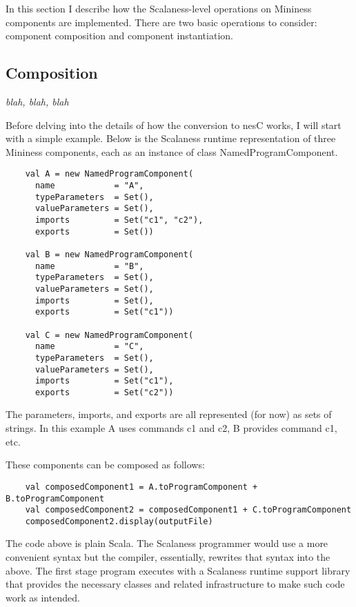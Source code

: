 In this section I describe how the Scalaness-level operations on Mininess components are
implemented. There are two basic operations to consider: component composition and component
instantiation.

\subsection{Composition}

\textit{blah, blah, blah}

Before delving into the details of how the conversion to nesC works, I will start with a simple
example. Below is the Scalaness runtime representation of three Mininess components, each as an
instance of class NamedProgramComponent.

\singlespace
\begin{lstlisting}
    val A = new NamedProgramComponent(
      name            = "A",
      typeParameters  = Set(),
      valueParameters = Set(),
      imports         = Set("c1", "c2"),
      exports         = Set())

    val B = new NamedProgramComponent(
      name            = "B",
      typeParameters  = Set(),
      valueParameters = Set(),
      imports         = Set(),
      exports         = Set("c1"))

    val C = new NamedProgramComponent(
      name            = "C",
      typeParameters  = Set(),
      valueParameters = Set(),
      imports         = Set("c1"),
      exports         = Set("c2"))
\end{lstlisting}
\primaryspacing

The parameters, imports, and exports are all represented (for now) as sets of strings. In this
example A uses commands c1 and c2, B provides command c1, etc.

These components can be composed as follows:

\singlespace
\begin{lstlisting}
    val composedComponent1 = A.toProgramComponent + B.toProgramComponent
    val composedComponent2 = composedComponent1 + C.toProgramComponent
    composedComponent2.display(outputFile)
\end{lstlisting}
\primaryspacing

The code above is plain Scala. The Scalaness programmer would use a more convenient syntax but
the compiler, essentially, rewrites that syntax into the above. The first stage program executes
with a Scalaness runtime support library that provides the necessary classes and related
infrastructure to make such code work as intended.

